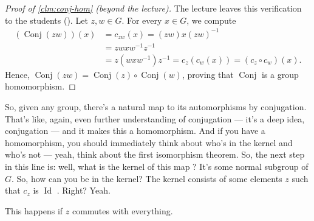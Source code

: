 \begin{content}
\begin{proof}[Proof of \cref{clm:conj-hom} (beyond the lecture)]
The lecture leaves this verification to the students (). Let $z, w \in G$. For every $x \in G$, we compute
\begin{align}
(\operatorname{Conj}(zw))(x) &= c_{zw}(x) = (zw) x (zw)^{-1} \nonumber \\
&= z w x w^{-1} z^{-1} \nonumber \\
&= z (w x w^{-1}) z^{-1} = c_z(c_w(x)) = (c_z \circ c_w)(x). \label{eq:conj-hom-check}
\end{align}
Hence, $\operatorname{Conj}(zw) = \operatorname{Conj}(z) \circ \operatorname{Conj}(w)$, proving that $\operatorname{Conj}$ is a group homomorphism.
\end{proof}
\end{content}

\begin{hidden}
\end{hidden}

\begin{speech}[00:25:15 - 00:26:10]
So, given any group, there's a natural map to its automorphisms by conjugation. That's like, again, even further understanding of conjugation --- it's a deep idea, conjugation --- and it makes this a homomorphism. And if you have a homomorphism, you should immediately think about who's in the kernel and who's not --- yeah, think about the first isomorphism theorem. So, the next step in this line is: well, what is the kernel of this map ? It's some normal subgroup of $G$. So, how can you be in the kernel? The kernel consists of some elements $z$ such that $c_z$ is $\operatorname{Id}$ . Right? Yeah.
\end{speech}

\begin{student}
This happens if $z$ commutes with everything.
\end{student}

